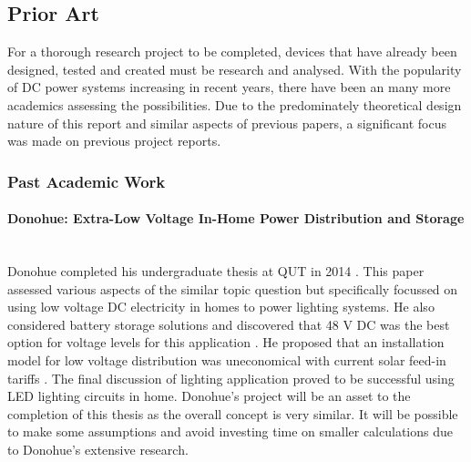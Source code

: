 
\subsection{Prior Art}

For a thorough research project to be completed, devices that have already been designed, tested and created must be research and analysed. With the popularity of DC power systems increasing in recent years, there have been an many more academics assessing the possibilities. Due to the predominately theoretical design nature of this report and similar aspects of previous papers, a significant focus was made on previous project reports.  

\subsubsection{Past Academic Work}

\paragraph{Donohue: Extra-Low Voltage In-Home Power Distribution and Storage}
~\\
Donohue completed his undergraduate thesis at QUT in 2014 \cite{Donohue2014}. This paper assessed various aspects of the similar topic question but specifically focussed on using low voltage DC electricity in homes to power lighting systems. He also considered battery storage solutions and discovered that 48 V DC was the best option for voltage levels for this application \cite{Donohue2014}. He proposed that an installation model for low voltage distribution was uneconomical with current solar feed-in tariffs \cite{Donohue2014}. The final discussion of lighting application proved to be successful using LED lighting circuits in home. Donohue's project will be an asset to the completion of this thesis as the overall concept is very similar. It will be possible to make some assumptions and avoid investing time on smaller calculations due to Donohue's extensive research.         

